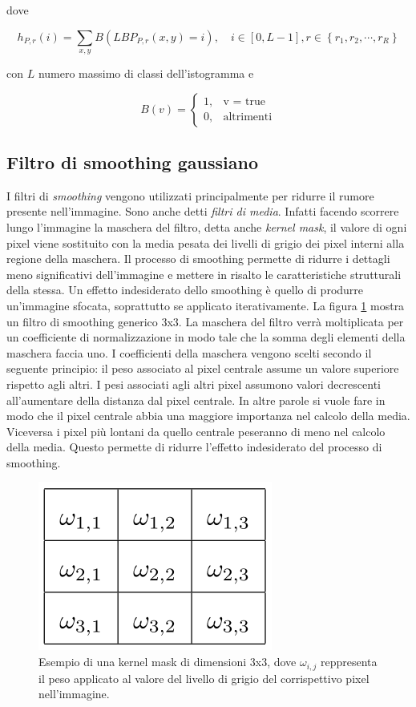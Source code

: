 \noindent dove

\begin{equation}
h_{P,r}(i) = \sum_{x, y} B(LBP_{P,r}(x, y) = i),\quad i \in  [0, L-1 ], r \in \left\lbrace  r_1, r_2, \cdots, r_R \right\rbrace
\end{equation}

\noindent con $L$ numero massimo di classi dell'istogramma e

\begin{equation}
B(v) = 	\begin{cases} 1, & \mbox{v = true} \\ 0, & \mbox{altrimenti} \end{cases}
\end{equation}

\subsection{Filtro di smoothing gaussiano}
I filtri di \emph{smoothing} vengono utilizzati principalmente per ridurre il rumore presente nell'immagine. Sono anche detti \emph{filtri di media}. Infatti facendo scorrere lungo l'immagine la maschera del filtro, detta anche \emph{kernel mask}, il valore di ogni pixel viene sostituito con la media pesata dei livelli di grigio dei pixel interni alla regione della maschera. Il processo di smoothing permette di ridurre i dettagli meno significativi dell'immagine e mettere in risalto le caratteristiche strutturali della stessa.
Un effetto indesiderato dello smoothing è quello di produrre un'immagine sfocata, soprattutto se applicato iterativamente.
La figura \ref{fig:kernelMask} mostra un filtro di smoothing generico 3x3. La maschera del filtro verrà moltiplicata per un coefficiente di normalizzazione in modo tale che la somma degli elementi della maschera faccia uno. I coefficienti della maschera vengono scelti secondo il seguente principio: il peso associato al pixel centrale assume un valore superiore rispetto agli altri. I pesi associati agli altri pixel assumono valori decrescenti all'aumentare della distanza dal pixel centrale. In altre parole si vuole fare in modo che il pixel centrale abbia una maggiore importanza nel calcolo della media. Viceversa i pixel più lontani da quello centrale peseranno di meno nel calcolo della media. Questo permette di ridurre l'effetto indesiderato del processo di smoothing. \\

\begin{figure}[ht]
\begin{center}
\includegraphics[width=.3\textwidth]{img/kernel_mask}
\caption{ Esempio di una kernel mask di dimensioni 3x3, dove $\omega_{i,j}$ reppresenta il peso applicato al valore del livello di grigio del corrispettivo pixel nell'immagine.}
\label{fig:kernelMask}
\end{center}
\end{figure}

